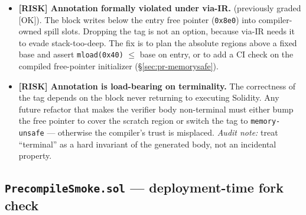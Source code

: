 \begin{itemize}
  \item \textcolor{rustorange}{\textbf{[RISK] Annotation formally
        violated under via-IR.}}  (previously graded
        [OK]). The block writes below the entry free pointer
        (\texttt{0x8e0}) into compiler-owned spill slots. Dropping the tag
        is not an option, because via-IR needs it to evade stack-too-deep.
         The fix is to plan the absolute regions above a
        fixed base and assert \texttt{mload(0x40)} $\le$ base on entry, or
        to add a CI check on the compiled free-pointer initializer
        (\S\ref{sec:pr-memorysafe}).
  \item \textcolor{rustorange}{\textbf{[RISK] Annotation is load-bearing
        on terminality.}} The correctness of the tag depends on the
        block never returning to executing Solidity. Any future refactor
        that makes the verifier body non-terminal must either bump the
        free pointer to cover the scratch region or switch the tag to
        \texttt{memory-unsafe} --- otherwise the compiler's trust is
        misplaced. \emph{Audit note:} treat ``terminal'' as a hard
        invariant of the generated body, not an incidental property.
\end{itemize}

\subsection{\texttt{PrecompileSmoke.sol} --- deployment-time fork check}
\label{sec:smoke}

